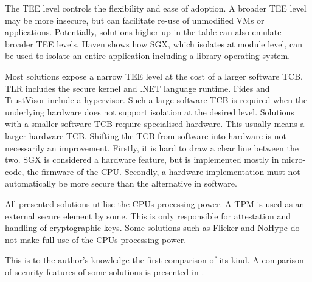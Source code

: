 The TEE level controls the flexibility and ease of adoption.\label{ID_1265116413}
A broader TEE level may be more insecure, but can facilitate re-use of unmodified VMs or applications.\label{ID_726502290}
Potentially, solutions higher up in the table can also emulate broader TEE levels.\label{ID_409119986}
Haven shows how SGX, which isolates at module level, can be used to isolate an entire application including a library operating system.\label{ID_1577048947}

Most solutions expose a narrow TEE level at the cost of a larger software TCB. TLR includes the secure kernel and .NET language runtime. Fides and TrustVisor include a hypervisor.\label{ID_289926468}
Such a large software TCB is required when the underlying hardware does not support isolation at the desired level. Solutions with a smaller software TCB require specialised hardware. This usually means a larger hardware TCB.\label{ID_7381152}
Shifting the TCB from software into hardware is not necessarily an improvement. Firstly, it is hard to draw a clear line between the two. SGX is considered a hardware feature, but is implemented mostly in micro-code, the firmware of the CPU.\cite[]{sgx-explained}\label{ID_135747553}
Secondly, a hardware implementation must not automatically be more secure than the alternative in software.\label{ID_1373303945}

All presented solutions utilise the CPUs processing power. A TPM is used as an external secure element by some. This is only responsible for attestation and handling of cryptographic keys.\label{ID_1726004639}
Some solutions such as Flicker and NoHype do not make full use of the CPUs processing power.\label{ID_1646772907}

This is to the author's knowledge the first comparison of its kind.\label{ID_122305244}
A comparison of security features of some solutions is presented in \cite{sgx-explained}.\label{ID_842412303}

